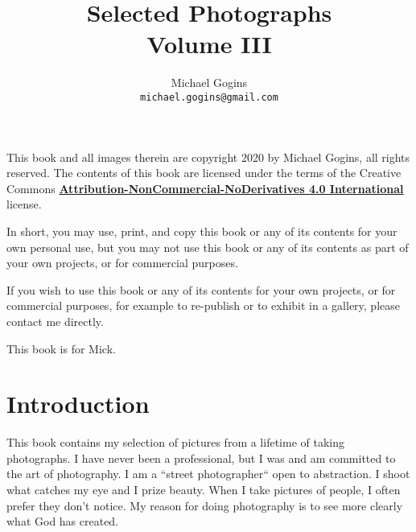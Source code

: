 \documentclass[10pt,letter,oneside]{scrbook}
\begin{document}
	\frontmatter
	\onecolumn
	
	\title{Selected Photographs \\ Volume III}
	\author{Michael Gogins \\ \texttt{michael.gogins@gmail.com}}
	
	\maketitle
	
	\clearpage
	\noindent This book and all images therein are copyright 2020 by Michael Gogins, all rights reserved. The contents of this book are licensed under the terms of the Creative Commons \href{https://creativecommons.org/licenses/by-nc-nd/4.0/legalcode}{\textbf{Attribution-NonCommercial-NoDerivatives 4.0 International} } license. 
	
	In short, you may use, print, and copy this book or any of its contents for your own personal use, but you may not use this book or any of its contents as part of your own projects, or for commercial purposes.
	
	If you wish to use this book or any of its contents for your own projects, or for commercial purposes, for example to re-publish or to exhibit in a gallery, please contact me directly.
	
	\clearpage
	\begin{centering}
		This book is for Mick.
	\end{centering}
	
	\tableofcontents
	\listoffigures
	
	\mainmatter
	
	\pagestyle{headings}
	\twocolumn
	\chapter{Introduction}
	
	This book contains my selection of pictures from a lifetime of taking photographs. I have never been a professional, but I was and am committed to the art of photography. I am a ``street photographer`` open to abstraction. I shoot what catches my eye and I prize beauty. When I take pictures of people, I often prefer they don't notice. My reason for doing photography is to see more clearly what God has created.
	
\end{document}
